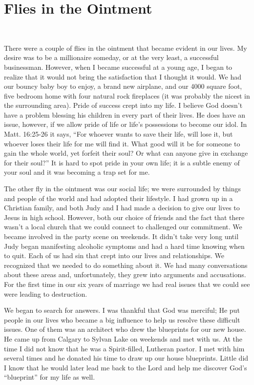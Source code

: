 \documentclass[twoside, 12pt]{book}
\begin{document}
\section{Flies in the Ointment}
\

There were a couple of flies in the ointment that became evident in our lives. My desire was to be a millionaire someday, or at the very least, a successful businessman. However, when I became successful at a young age, I began to realize that it would not bring the satisfaction that I thought it would. We had our bouncy baby boy to enjoy, a brand new airplane, and our 4000 square foot, five bedroom home with four natural rock fireplaces (it was probably the nicest in the surrounding area).  Pride of success crept into my life. I believe God doesn't have a problem blessing his children in every part of their lives. He does have an issue, however, if we allow pride of life or life's possessions to become our idol. In Matt. 16:25-26 it says, “For whoever wants to save their life, will lose it, but whoever loses their life for me will find it. What good will it be for someone to gain the whole world, yet forfeit their soul? Or what can anyone give in exchange for their soul?” It is hard to spot pride in your own life; it is a subtle enemy of your soul and it was becoming a trap set for me.

The other fly in the ointment was our social life; we were surrounded by things and people of the world and had adopted their lifestyle. I had grown up in a Christian family, and both Judy and I had made a decision to give our lives to Jesus in high school. However, both our choice of friends and the fact that there wasn't a local church that we could connect to challenged our commitment. We became involved in the party scene on weekends. It didn't take very long until Judy began manifesting alcoholic symptoms and had a hard time knowing when to quit. Each of us had sin that crept into our lives and relationships. We recognized that we needed to do something about it. We had many conversations about these areas and, unfortunately, they grew into arguments and accusations. For the first time in our six years of marriage we had real issues that we could see were leading to destruction.

We began to search for answers. I was thankful that God was merciful; He put people in our lives who became a big influence to help us resolve these difficult issues. One of them was an architect who drew the blueprints for our new house. He came up from Calgary to Sylvan Lake on weekends and met with us. At the time I did not know that he was a Spirit-filled, Lutheran pastor. I met with him several times and he donated his time to draw up our house blueprints. Little did I know that he would later lead me back to the Lord and help me discover God's “blueprint” for my life as well.
\end{document}
